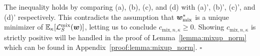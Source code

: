 The inequality holds by comparing (a), (b), (c), and (d) with (a)', (b)', (c)', and (d)' respectively. This contradicts the assumption that ${\bm{w}}_{\mathrm{mix}}^*$ is a unique minimizer of $\mathbb{E}_\kappa[\mathcal{L}_S^\mathrm{mix}({\bm{w}})]$, letting us to conclude $c_{\mathrm{mix},n, \kappa} \geq 0$. Showing $c_{\mathrm{mix},n, \kappa}$ is strictly positive will be handled in the proof of Lemma~\ref{lemma:mixup_norm} which can be found in Appendix~\ref{proof:lemma:mixup_norm}. \hfill $\square$